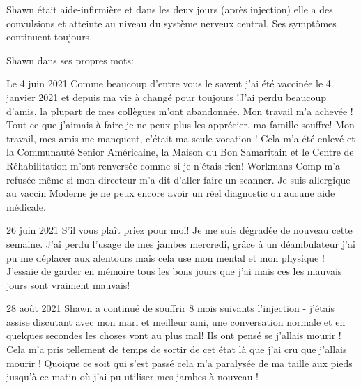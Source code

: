 Shawn était aide-infirmière et dans les deux jours (après injection) elle a des
convulsions et atteinte au niveau du système nerveux central. Ses symptômes
continuent toujours.

Shawn dans ses propres mots:

Le 4 juin 2021 Comme beaucoup d’entre vous le savent j’ai été vaccinée le 4
janvier 2021 et depuis ma vie à changé pour toujours !J’ai perdu beaucoup
d’amis, la plupart de mes collègues m’ont abandonnée. Mon travail m’a achevée !
Tout ce que j’aimais à faire je ne peux plus les apprécier, ma famille souffre!
Mon travail, mes amis me manquent, c’était ma seule vocation ! Cela m’a été
enlevé et la Communauté Senior Américaine, la Maison du Bon Samaritain et le
Centre de Réhabilitation m’ont renversée comme si je n’étais rien! Workmans Comp
m’a refusée même si mon directeur m’a dit d’aller faire un scanner. Je suis
allergique au vaccin Moderne je ne peux encore avoir un réel diagnostic ou
aucune aide médicale.

26 juin 2021 S’il vous plaît priez pour moi! Je me suis dégradée de nouveau
cette semaine. J’ai perdu l’usage de mes jambes mercredi, grâce à un
déambulateur j’ai pu me déplacer aux alentours mais cela use mon mental et mon
physique ! J’essaie de garder en mémoire tous les bons jours que j’ai mais ces
les mauvais jours sont vraiment mauvais!

28 août 2021 Shawn a continué de souffrir 8 mois suivants l’injection - j’étais
assise discutant avec mon mari et meilleur ami, une conversation normale et en
quelques secondes les choses vont au plus mal! Ils ont pensé se j’allais mourir
! Cela m’a pris tellement de temps de sortir de cet état là que j’ai cru que
j’allais mourir ! Quoique ce soit qui s’est passé cela m’a paralysée de ma
taille aux pieds jusqu’à ce matin où j’ai pu utiliser mes jambes à nouveau !

